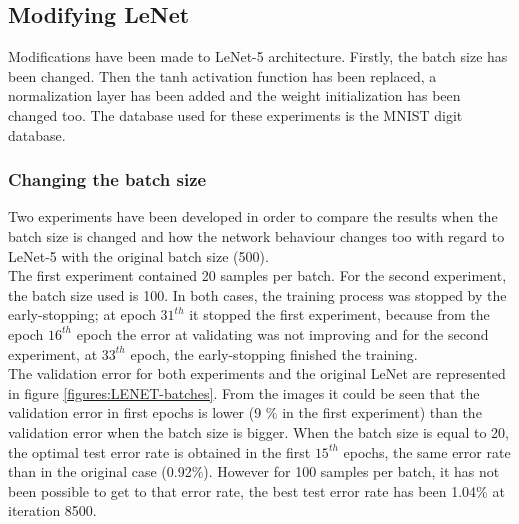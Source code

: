 \subsection{Modifying LeNet}
Modifications have been made to LeNet-5 architecture. Firstly, the batch size has been changed. Then the tanh activation function has been replaced, a normalization layer has been added and the weight initialization has been changed too. The database used for these experiments is the MNIST digit database.

\subsubsection{Changing the batch size}
Two experiments have been developed in order to compare the results when the batch size is changed and how the network behaviour changes too with regard to LeNet-5 with the original batch size (500).\\

The first experiment contained 20 samples per batch. For the second experiment, the batch size used is 100. In both cases, the training process was stopped by the early-stopping; at epoch $31^{th}$ it stopped the first experiment, because from the epoch $16^{th}$ epoch the error at validating was not improving and for the second experiment, at $33^{th}$ epoch, the early-stopping finished the training.\\

The validation error for both experiments and the original LeNet are represented in figure \ref{figures:LENET-batches}. From the images it could be seen that the validation error in first epochs is lower (9 \% in the first experiment) than the validation error when the batch size is bigger. When the batch size is equal to 20, the optimal test error rate is obtained in the first $15^{th}$ epochs, the same error rate than in the original case (0.92\%). However for 100 samples per batch, it has not been possible to get to that error rate, the best test error rate has been 1.04\% at iteration 8500.\\

